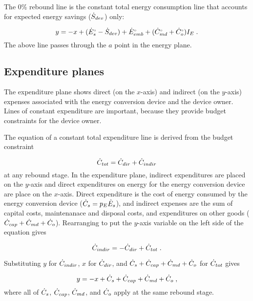 The 0\% rebound line is the constant total energy consumption line 
that accounts for expected energy savings ($\dot{S}_{dev}$) only:

\begin{equation}
  y = -x + ({}{\dot{E}}^{\scriptscriptstyle \circ}_s - \dot{S}_{dev})
          + {}{\dot{E}}^{\scriptscriptstyle \circ}_{emb} + ({}{\dot{C}}^{\scriptscriptstyle \circ}_{md} + {}{\dot{C}}^{\scriptscriptstyle \circ}_o) I_E \; .
\end{equation}
%
The above line passes through the $a$ point in the energy plane.


\subsection{Expenditure planes}
\label{sec:expenditure_path_graph_details}

The expenditure plane shows direct (on the $x$-axis) and indirect (on the $y$-axis)
expenses associated with the energy conversion device 
and the device owner.
Lines of constant expenditure are important, 
because they provide budget constraints for the device owner.

The equation of a constant total expenditure line is derived from 
the budget constraint

\begin{equation}
  \dot{C}_{tot} = \dot{C}_{dir} + \dot{C}_{indir}
\end{equation}
%
at any rebound stage.
In the expenditure plane,
indirect expenditures are placed on the $y$-axis
and direct expenditures on energy for the energy conversion device are place on the $x$-axis.
Direct expenditure is the cost of energy consumed by the energy conversion device
($\dot{C}_s = p_E \dot{E}_s$), and 
indirect expenses are the sum of capital costs, 
maintenanace and disposal costs, and 
expenditures on other goods
($\dot{C}_{cap} + \dot{C}_{md} + \dot{C}_o$).
Rearranging to put the $y$-axis variable on the left side of the equation gives

\begin{equation}
  \dot{C}_{indir} = - \dot{C}_{dir} + \dot{C}_{tot} \; .
\end{equation}

Substituting $y$ for $\dot{C}_{indir}$, 
$x$ for $\dot{C}_{dir}$, and 
$\dot{C}_s + \dot{C}_{cap} + \dot{C}_{md} + \dot{C}_o$ for $\dot{C}_{tot}$
gives

\begin{equation}
  y = -x + \dot{C}_s + \dot{C}_{cap} + \dot{C}_{md} + \dot{C}_o \; ,
\end{equation}
%
where all of $\dot{C}_s$, $\dot{C}_{cap}$, $\dot{C}_{md}$, and $\dot{C}_o$
apply at the same rebound stage.

